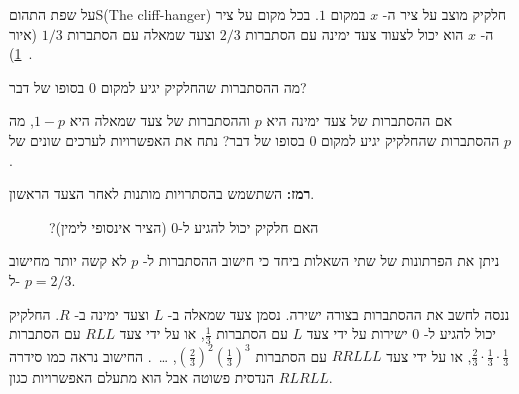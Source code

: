 
\begin{prob}{על שפת התהום}{S}{(The cliff-hanger)}
חלקיק מוצב על ציר ה-%
$x$
במקום
$1$.
בכל מקום על ציר ה-%
$x$
הוא יכול לצעוד צעד ימינה עם הסתברות
$2/3$
וצעד שמאלה עם הסתברות
$1/3$
(איור%
~\ref{f.ruin1}).

מה ההסתברות שהחלקיק יגיע למקום
$0$
בסופו של דבר?

אם ההסתברות של צעד ימינה היא
$p$
וההסתברות של צעד שמאלה היא
$1-p$,
מה ההסתברות שהחלקיק יגיע למקום
$0$
בסופו של דבר? נתח את האפשרויות לערכים שונים של
$p$.

\textbf{רמז:}
השתשמש בהסתרויות מותנות לאחר הצעד הראשון.
\begin{figure}[tb]
\begin{center}
\end{center}
\caption{?האם חלקיק יכול להגיע ל-$0$ (הציר אינסופי לימין)}\label{f.ruin1}
\end{figure}

\end{prob}

\solution{}

ניתן את הפרתונות של שתי השאלות ביחד כי חישוב ההסתברות ל-%
$p$
לא קשה יותר מחישוב ל-%
$p=2/3$.

ננסה לחשב את ההסתברות בצורה ישירה. נסמן צעד שמאלה ב-%
$L$
וצעד ימינה ב-%
$R$.
החלקיק יכול להגיע ל-%
$0$
ישירות על ידי צעד
$L$
עם הסתברות
$\frac{1}{3}$,
או על ידי צעד
$RLL$
עם הסתברות
$\frac{2}{3}\cdot\frac{1}{3}\cdot\frac{1}{3}$,
או על ידי צעד
$RRLLL$
עם הסתברות
$\left(\frac{2}{3}\right)^2\left(\frac{1}{3}\right)^3$, \ldots\ .
החישוב נראה כמו סידרה הנדסית פשוטה אבל הוא מתעלם האפשרויות כגון
$RLRLL$.

